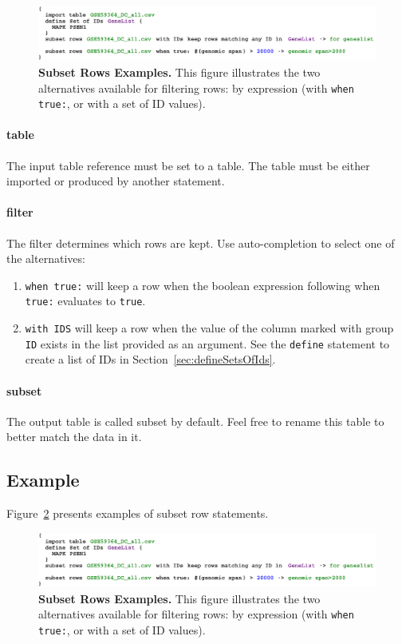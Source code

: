 \begin{figure}[h!tbp]
  \centering
  \includegraphics[width=\figWidthWide]{figures/ExampleSubsetRows.pdf}
\caption[Subset Rows Examples.]{\textbf{Subset Rows Examples.} This figure illustrates the two alternatives available for filtering rows: by expression (with \texttt{when true:}, or with a set of ID values).}
\label{fig:ExampleSubsetRows}
\end{figure}


\paragraph{table}
The input table reference must be set to a table. The table must be either imported or produced by another statement.
\paragraph{filter}
The filter determines which rows are kept. Use auto-completion to select one of the alternatives:
\begin{enumerate}
	\item \texttt{when true:} will keep a row when the boolean expression following when \texttt{true:} evaluates to  \texttt{true}.
	\item \texttt{with IDS} will keep a row when the value of the column marked with group \texttt{ID} exists in the list provided as an argument. See the \texttt{define} statement to create a list of IDs in Section~\ref{sec:defineSetsOfIds}. 
\end{enumerate}

\paragraph{subset}
The output table is called subset by default. Feel free to rename this table to better match the data in it.

\subsection{Example}
Figure~\ref{fig:ExampleSubsetRows} presents examples of subset row statements. 

\begin{figure}[h!tbp]
  \centering
  \includegraphics[width=\figWidthWide]{figures/ExampleSubsetRows.pdf}
\caption[Subset Rows Examples.]{\textbf{Subset Rows Examples.} This figure illustrates the two alternatives available for filtering rows: by expression (with \texttt{when true:}, or with a set of ID values).}
\label{fig:ExampleSubsetRows}
\end{figure}

